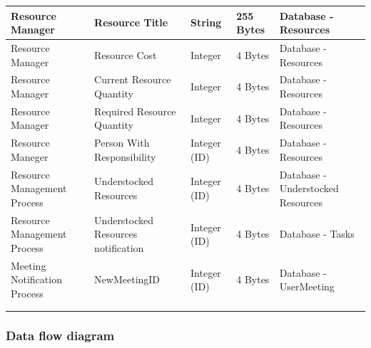 \begin{table}[]
\begin{tabular}{|l|l|l|l|l|}
Resource Manager & Resource Title & String & 255 Bytes & Database - Resources \\ \hline
Resource Manager & Resource Cost & Integer & 4 Bytes & Database - Resources \\ \hline
Resource Manager & Current Resource Quantity & Integer & 4 Bytes & Database - Resources \\ \hline
Resource Manager & Required Resource Quantity & Integer & 4  Bytes & Database - Resources \\ \hline
Resource Maneger & Person With Responsibility & Integer (ID) & 4 Bytes & Database - Resources \\ \hline
Resource Management Process & Understocked Resources & Integer (ID) & 4 Bytes & Database - Understocked Resources \\ \hline
Resource Management Process & Understocked Resources notification & Integer (ID) & 4 Bytes & Database - Tasks \\ \hline
Meeting Notification Process & NewMeetingID & Integer (ID) & 4 Bytes & Database - UserMeeting \\ \hline
 &  &  &  &  \\ \hline
 &  &  &  &  \\ \hline
\end{tabular}
\end{table}

\subsubsection{Data flow diagram}


